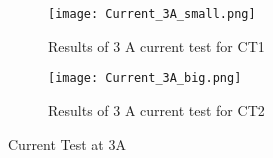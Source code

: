 \begin{figure}
  \centering
  \begin{subfigure}[b]{\linewidth}
    \texttt{[image: Current\_3A\_small.png]}
    \caption{Results of 3 A current test for CT1}
  \end{subfigure}
  \begin{subfigure}[b]{\linewidth}
    \texttt{[image: Current\_3A\_big.png]}
    \caption{Results of 3 A current test for CT2}
  \end{subfigure}
  \caption{Current Test at 3A}
  \label{fig:CurrentCalibration}
\end{figure}
